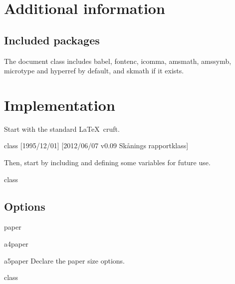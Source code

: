 \documentclass{skdoc}
\begin{document}
	\section{Additional information}
	\subsection{Included packages}
	The document class includes \textsf{babel}, \textsf{fontenc},
	\textsf{icomma}, \textsf{amsmath}, \textsf{amssymb}, \textsf{microtype} and
	\textsf{hyperref} by default, and \textsf{skmath} if it exists.

	\section{Implementation}
	Start with the standard \LaTeX\ cruft.
\begin{MacroCode}{class}
[1995/12/01]
%
    [2012/06/07 v0.09 Skånings rapportklass]
\end{MacroCode}
	Then, start by including  and defining some
	variables for future use.
\begin{MacroCode}{class}
\RequirePackage{xstring}
\RequirePackage{kvoptions}
\newcommand\@ptsize{}
\end{MacroCode}

	\subsection{Options}
	\begin{option}{paper}
	\begin{option}{a4paper}
	\begin{option}{a5paper}
	Declare the paper size options.
\begin{MacroCode}{class}
\newcommand*{\skrapport@SetupPaper}{\expandafter\@skrapport@SetupPaper\expandafter{\CurrentOption}}
\newcommand*{\@skrapport@SetupPaper}[1]{\setkeys{skrapport}{paper={#1}}}
\end{MacroCode}
	\end{option}
	\end{option}
	\end{option}
\end{document}
